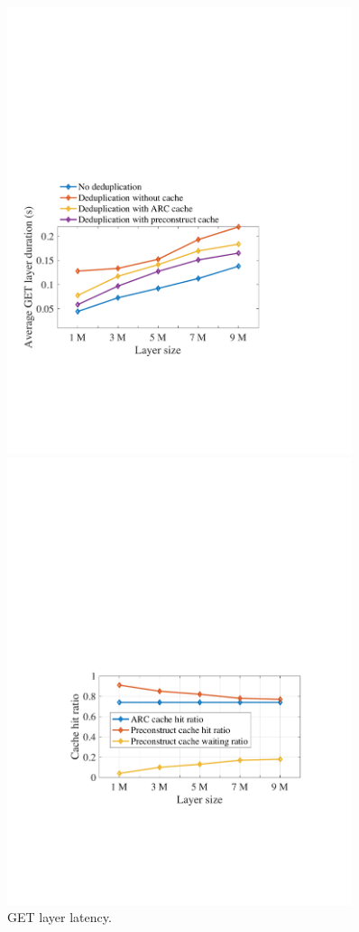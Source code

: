 \begin{figure}[t]
	\centering
	\begin{minipage}{0.3\textwidth}
		\centering
		\includegraphics[width=0.9\textwidth]{graphs/1nodegetlayerlatency.pdf}
		\caption{GET layer latency.}%
		\label{fig:eval-1nodegetlayerlatency}
	\end{minipage}%
	\begin{minipage}{0.3\textwidth}
		\centering
		\includegraphics[width=0.9\textwidth]{graphs/cachehitratio.pdf}

\end{minipage}
\end{figure}

